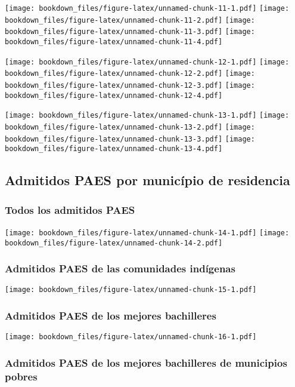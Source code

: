 \documentclass[]{article}
\theoremstyle{definition}
\theoremstyle{definition}
\theoremstyle{definition}
\theoremstyle{remark}
\begin{document}
\texttt{[image: bookdown\_files/figure-latex/unnamed-chunk-11-1.pdf]}
\texttt{[image: bookdown\_files/figure-latex/unnamed-chunk-11-2.pdf]}
\texttt{[image: bookdown\_files/figure-latex/unnamed-chunk-11-3.pdf]}
\texttt{[image: bookdown\_files/figure-latex/unnamed-chunk-11-4.pdf]}

\texttt{[image: bookdown\_files/figure-latex/unnamed-chunk-12-1.pdf]}
\texttt{[image: bookdown\_files/figure-latex/unnamed-chunk-12-2.pdf]}
\texttt{[image: bookdown\_files/figure-latex/unnamed-chunk-12-3.pdf]}
\texttt{[image: bookdown\_files/figure-latex/unnamed-chunk-12-4.pdf]}

\texttt{[image: bookdown\_files/figure-latex/unnamed-chunk-13-1.pdf]}
\texttt{[image: bookdown\_files/figure-latex/unnamed-chunk-13-2.pdf]}
\texttt{[image: bookdown\_files/figure-latex/unnamed-chunk-13-3.pdf]}
\texttt{[image: bookdown\_files/figure-latex/unnamed-chunk-13-4.pdf]}

\subsection{Admitidos PAES por município de
residencia}\label{admitidos-paes-por-municipio-de-residencia}

\subsubsection{Todos los admitidos PAES}\label{todos-los-admitidos-paes}

\texttt{[image: bookdown\_files/figure-latex/unnamed-chunk-14-1.pdf]}
\texttt{[image: bookdown\_files/figure-latex/unnamed-chunk-14-2.pdf]}

\subsubsection{Admitidos PAES de las comunidades
indígenas}\label{admitidos-paes-de-las-comunidades-indigenas}

\texttt{[image: bookdown\_files/figure-latex/unnamed-chunk-15-1.pdf]}

\subsubsection{Admitidos PAES de los mejores
bachilleres}\label{admitidos-paes-de-los-mejores-bachilleres}

\texttt{[image: bookdown\_files/figure-latex/unnamed-chunk-16-1.pdf]}

\subsubsection{Admitidos PAES de los mejores bachilleres de municipios
pobres}\label{admitidos-paes-de-los-mejores-bachilleres-de-municipios-pobres}
\end{document}
